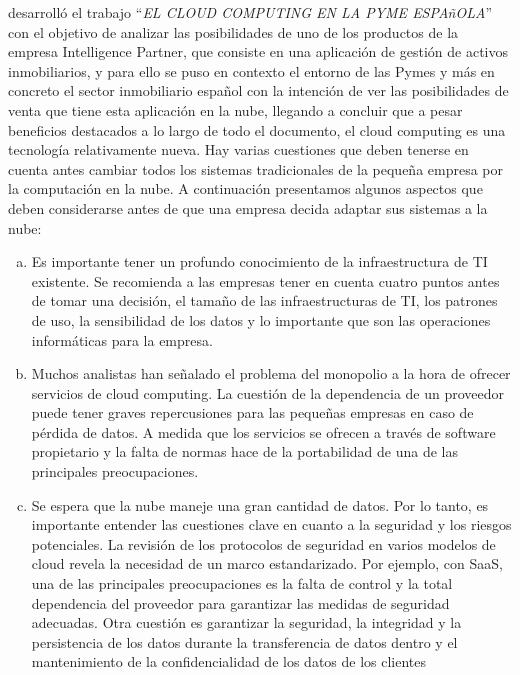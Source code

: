 \cite{diaz} desarrolló el trabajo ``\emph{EL CLOUD COMPUTING EN LA PYME ESPAñOLA}''
con el objetivo de analizar las posibilidades de uno de los productos de la empresa
Intelligence Partner, que consiste en una aplicación de gestión de activos inmobiliarios, y
para ello se puso en contexto el entorno de las Pymes y más en concreto el
sector inmobiliario español con la intención de ver las posibilidades de venta
que tiene esta aplicación en la nube, llegando a concluir que a pesar beneficios
destacados a lo largo de todo el documento, el cloud computing es una tecnología
relativamente nueva. Hay varias cuestiones que deben tenerse en cuenta antes cambiar
todos los sistemas tradicionales de la pequeña empresa por la computación en la nube.
A continuación presentamos algunos aspectos que deben considerarse antes de que una
empresa decida adaptar sus sistemas a la nube:
\begin{enumerate}[a.]
    \item   Es importante tener un profundo conocimiento de la infraestructura de TI
            existente. Se recomienda a las empresas tener en cuenta cuatro puntos
            antes de tomar una decisión, el tamaño de las infraestructuras de TI, los
            patrones de uso, la sensibilidad de los datos y lo importante que son las
            operaciones informáticas para la empresa.
    \item   Muchos analistas han señalado el problema del monopolio a la hora de
            ofrecer servicios de cloud computing. La cuestión de la dependencia de
            un proveedor puede tener graves repercusiones para las pequeñas
            empresas en caso de pérdida de datos. A medida que los servicios se
            ofrecen a través de software propietario y la falta de normas hace de la
            portabilidad de una de las principales preocupaciones.
    \item   Se espera que la nube maneje una gran cantidad de datos. Por lo tanto,
            es importante entender las cuestiones clave en cuanto a la seguridad y
            los riesgos potenciales. La revisión de los protocolos de seguridad en
            varios modelos de cloud revela la necesidad de un marco estandarizado.
            Por ejemplo, con SaaS, una de las principales preocupaciones es la falta
            de control y la total dependencia del proveedor para garantizar las
            medidas de seguridad adecuadas. Otra cuestión es garantizar la
            seguridad, la integridad y la persistencia de los datos durante la
            transferencia de datos dentro y el mantenimiento de la confidencialidad
            de los datos de los clientes
\end{enumerate}

